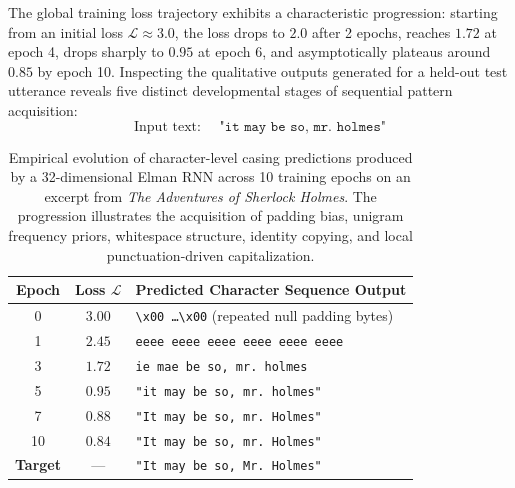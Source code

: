 \documentclass[../../main.tex]{subfiles}
\begin{document}
The global training loss trajectory exhibits a characteristic progression: starting from an initial loss $\mathcal{L} \approx 3.0$, the loss drops to $2.0$ after 2 epochs, reaches $1.72$ at epoch 4, drops sharply to $0.95$ at epoch 6, and asymptotically plateaus around $0.85$ by epoch 10. Inspecting the qualitative outputs generated for a held-out test utterance reveals five distinct developmental stages of sequential pattern acquisition:
\begin{equation}
\text{Input text: } \quad \texttt{"it may be so, mr. holmes"}
\end{equation}

\begin{table}[htbp]
\centering
\small
\begin{tabularx}{\textwidth}{c c X}
\toprule
\textbf{Epoch} & \textbf{Loss $\mathcal{L}$} & \textbf{Predicted Character Sequence Output} \\
\midrule
0 & $3.00$ & \texttt{\textbackslash x00 \dots \textbackslash x00} (repeated null padding bytes) \\
1 & $2.45$ & \texttt{eeee eeee eeee eeee eeee eeee} \\
3 & $1.72$ & \texttt{ie mae be so, mr. holmes} \\
5 & $0.95$ & \texttt{"it may be so, mr. holmes"} \\
7 & $0.88$ & \texttt{"It may be so, mr. Holmes"} \\
10 & $0.84$ & \texttt{"It may be so, mr. Holmes"} \\
\midrule
\textbf{Target} & --- & \texttt{"It may be so, Mr. Holmes"} \\
\bottomrule
\end{tabularx}
\caption{Empirical evolution of character-level casing predictions produced by a 32-dimensional Elman RNN across 10 training epochs on an excerpt from \textit{The Adventures of Sherlock Holmes}. The progression illustrates the acquisition of padding bias, unigram frequency priors, whitespace structure, identity copying, and local punctuation-driven capitalization.}
\label{tab:rnn_casing_progression}
\end{table}
\end{document}
